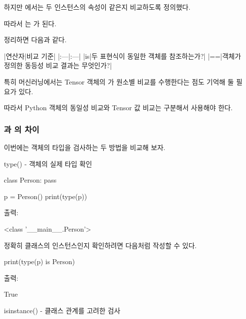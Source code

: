 하지만 에서는 두 인스턴스의  속성이 같은지 비교하도록 정의했다.

따라서 \zsh{==}는 가 된다.

정리하면 다음과 같다.

\begin{dhktable}
|연산자|비교 기준|
|:---|:---|
|is|두 표현식이 동일한 객체를 참조하는가?|
|==|객체가 정의한 동등성 비교 결과는 무엇인가?|
\end{dhktable}

특히 머신러닝에서는 Tensor 객체의 \zsh{==}가 원소별 비교를 수행한다는 점도 기억해 둘 필요가 있다.

따라서 Python 객체의 동일성 비교와 Tensor 값 비교는 구분해서 사용해야 한다.

\subsubsection{과 의 차이}

이번에는 객체의 타입을 검사하는 두 방법을 비교해 보자.

\begin{dhknote}
\begin{dhksmry}[centered]
type() - 객체의 실제 타입 확인
\end{dhksmry}
\end{dhknote}

\begin{dhkcode}
class Person:
    pass

p = Person()
print(type(p))
\end{dhkcode}

출력:

\begin{dhkzsh}
<class '__main__.Person'>
\end{dhkzsh}

정확히  클래스의 인스턴스인지 확인하려면 다음처럼 작성할 수 있다.

\begin{dhkcode}
print(type(p) is Person)
\end{dhkcode}

출력:

\begin{dhkzsh}
True
\end{dhkzsh}

\begin{dhknote}
\begin{dhksmry}[centered]
isinstance() - 클래스 관계를 고려한 검사
\end{dhksmry}
\end{dhknote}

